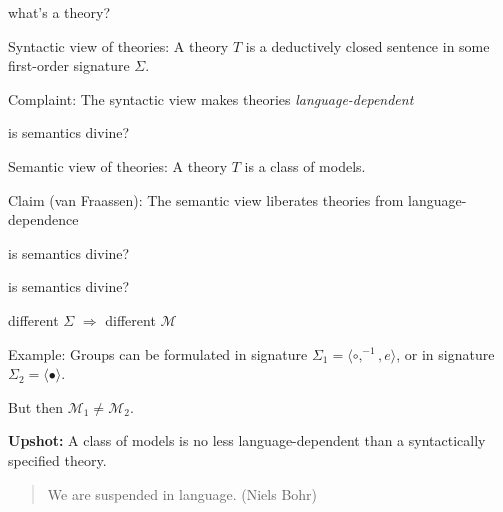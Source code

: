 \documentclass[17pt]{beamer}
\begin{document}
\begin{frame}{\small what's a theory?}

Syntactic view of theories: A theory $T$ is a deductively closed
sentence in some first-order signature $\Sigma$.

\bigskip

Complaint: The syntactic view makes theories \emph{language-dependent}


\end{frame}


\begin{frame}{\small is semantics divine?}

Semantic view of theories: A theory $T$ is a class of models.

\bigskip 

Claim (van Fraassen): The semantic view liberates theories from
language-dependence


\end{frame}

\begin{frame}[fragile]{\small is semantics divine?}


\end{frame}

\begin{frame}{\small is semantics divine?}

different $\Sigma$ $\Rightarrow$ different $\mathcal{M}$

\bigskip \bigskip Example: Groups can be formulated in signature
$\Sigma _1=\langle \circ ,^{-1},e\rangle$, or in signature
$\Sigma _2=\langle \bullet \rangle$.

\bigskip \bigskip

But then $\mathcal{M}_1\neq \mathcal{M}_2$. \end{frame}

\begin{frame}{}

\textbf{Upshot:} A class of models is no less language-dependent
than a syntactically specified theory.

\bigskip

\begin{quote}
  We are suspended in language. (Niels Bohr) \end{quote}



\end{frame}
\end{document}
